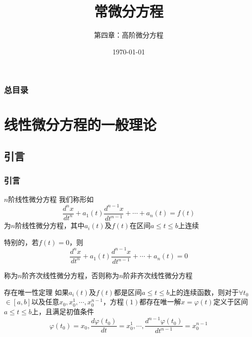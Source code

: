 \documentclass[aspectratio=169, 10pt, utf8, mathserif]{beamer}
\begin{document}
	
	
	\title{常微分方程}
	\subtitle{第四章：高阶微分方程}
	\date{\today}
	\begin{frame}
		\titlepage
	\end{frame}
	
	\begin{frame}
		\frametitle{总目录}
		\begin{multicols}{2}
			\tableofcontents[hideallsubsections]
		\end{multicols}
	\end{frame}
	
	\section{线性微分方程的一般理论}
	\subsection{引言}
	\begin{frame}
		\frametitle{引言}
	\begin{exampleblock}{$n$阶线性微分方程}
		我们称形如
		\begin{equation}
			\frac{d^nx}{dt^n}+a_1\left( t \right) \frac{d^{n-1}x}{dt^{n-1}}+\cdots +a_n\left( t \right) =f\left( t \right)
		\end{equation}
		为$n$阶线性微分方程，其中$a_{i}(t)$及$f(t)$在区间$a\le t\le b$上连续
	\end{exampleblock}
	特别的，若$f(t)=0$，则
		\begin{equation*}
		\frac{d^nx}{dt^n}+a_1\left( t \right) \frac{d^{n-1}x}{dt^{n-1}}+\cdots +a_n\left( t \right) =0
	\end{equation*}
	
	称为$n$阶齐次线性微分方程，否则称为$n$阶非齐次线性微分方程
	\end{frame}
		\begin{frame}
	
		\begin{block}{存在唯一性定理}
			如果$a_{i}(t)$及$f(t)$都是区间$a\le t\le b$上的连续函数，则对于$\forall$$t_{0}$$\in$$[a,b]$以及任意$x_0,x_{0}^{1},\cdots ,x_{0}^{n-1}$，方程$(1)$都存在唯一解$x=\varphi \left( t \right) $定义于区间$a\le t\le b$上，且满足初值条件
			\begin{equation*}
				\varphi \left( t_0 \right) =x_0,\frac{d\varphi \left( t_0 \right)}{dt}=x_{0}^{1},\cdots ,\frac{d^{n-1}\varphi \left( t_0 \right)}{dt^{n-1}}=x_{0}^{n-1}
			\end{equation*}
		\end{block}
		
	\end{frame}
\end{document}
